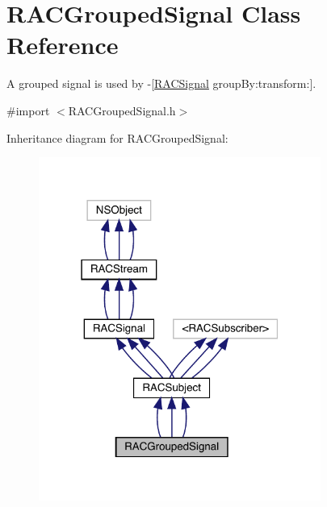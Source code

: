 \hypertarget{interface_r_a_c_grouped_signal}{}\section{R\+A\+C\+Grouped\+Signal Class Reference}
\label{interface_r_a_c_grouped_signal}


A grouped signal is used by -\/\mbox{[}\mbox{\hyperlink{interface_r_a_c_signal}{R\+A\+C\+Signal}} group\+By\+:transform\+:\mbox{]}.  




{\ttfamily \#import $<$R\+A\+C\+Grouped\+Signal.\+h$>$}



Inheritance diagram for R\+A\+C\+Grouped\+Signal\+:\nopagebreak
\begin{figure}[H]
\begin{center}
\leavevmode
\includegraphics[width=262pt]{interface_r_a_c_grouped_signal__inherit__graph}
\end{center}
\end{figure}



